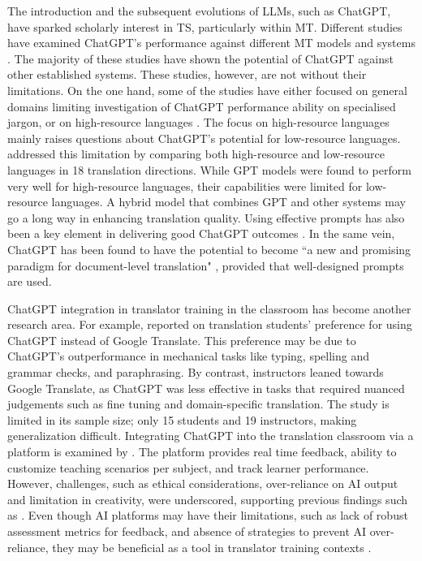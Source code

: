 \documentclass[english]{textolivre}
\begin{document}
The introduction and the subsequent evolutions of LLMs, such as ChatGPT, have sparked scholarly interest in TS, particularly within MT. Different studies have examined ChatGPT’s performance against different MT models and systems \cite{kocmi2022, gao2023, peng2023, lu2023, wang2023, hendy2023}. The majority of these studies have shown the potential of ChatGPT against other established systems. These studies, however, are not without their limitations. On the one hand, some of the studies have either focused on general domains \cite{kocmi2022} limiting investigation of ChatGPT performance ability on specialised jargon, or on high-resource languages \cite{gao2023}. The focus on high-resource languages mainly raises questions about ChatGPT’s potential for low-resource languages. \textcite{hendy2023} addressed this limitation by comparing both high-resource and low-resource languages in 18 translation directions. While GPT models were found to perform very well for high-resource languages, their capabilities were limited for low-resource languages. A hybrid model that combines GPT and other systems may go a long way in enhancing translation quality. Using effective prompts has also been a key element in delivering good ChatGPT outcomes \cite{peng2023}. In the same vein, ChatGPT has been found to have the potential to become ``a new and promising paradigm for document-level translation" \cite[p. 1]{wang2023}, provided that well-designed prompts are used.

ChatGPT integration in translator training in the classroom has become another research area. For example, \textcite{sahari2023} reported on translation students’ preference for using ChatGPT instead of Google Translate. This preference may be due to ChatGPT’s outperformance in mechanical tasks like typing, spelling and grammar checks, and paraphrasing. By contrast, instructors leaned towards Google Translate, as ChatGPT was less effective in tasks that required nuanced judgements such as fine tuning and domain-specific translation. The study is limited in its sample size; only 15 students and 19 instructors, making generalization difficult. Integrating ChatGPT into the translation classroom via a platform is examined by \textcite{xu2025}. The platform provides real time feedback, ability to customize teaching scenarios per subject, and track learner performance. However, challenges, such as ethical considerations, over-reliance on AI output and limitation in creativity, were underscored, supporting previous findings such as \textcite{sahari2023}. Even though AI platforms may have their limitations, such as lack of robust assessment metrics for feedback, and absence of strategies to prevent AI over-reliance, they may be beneficial as a tool in translator training contexts \cite{xu2025}.
\end{document}
